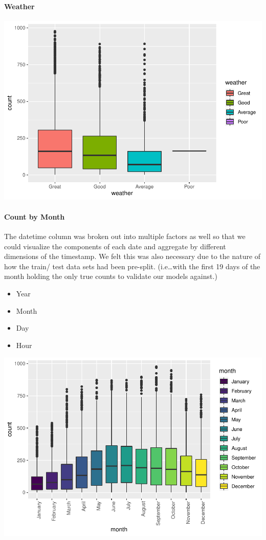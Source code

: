 \documentclass[american,]{article}
\providecommand{\tightlist}{%
  \setlength{\itemsep}{0pt}\setlength{\parskip}{0pt}}
\let\oldparagraph\paragraph
\renewcommand{\paragraph}[1]{\oldparagraph{#1}\mbox{}}
\begin{document}
\hypertarget{weather}{%
\paragraph{Weather}\label{weather}}

\includegraphics{BikeSharingDemand_files/figure-latex/train.mod.1.weather-1.pdf}

\newpage

\hypertarget{count-by-month}{%
\paragraph{Count by Month}\label{count-by-month}}

The datetime column was broken out into multiple factors as well so that we could visualize the components of each date and aggregate by different dimensions of the timestamp. We felt this was also necessary due to the nature of how the train/ test data sets had been pre-split. (i.e\ldots{}with the first 19 days of the month holding the only true counts to validate our models against.)

\begin{itemize}
\tightlist
\item
  Year
\item
  Month
\item
  Day
\item
  Hour
\end{itemize}

\includegraphics{BikeSharingDemand_files/figure-latex/train.mod.1.month-1.pdf}
\end{document}
